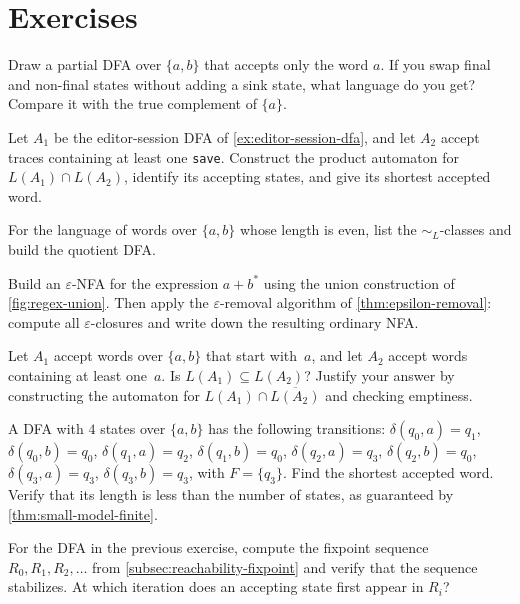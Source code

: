 \section*{Exercises}

\begin{chapex}
Draw a partial DFA over $\{a,b\}$ that accepts only the word $a$.  If you
swap final and non-final states without adding a sink state, what
language do you get?  Compare it with the true complement of $\{a\}$.
\end{chapex}

\begin{chapex}
Let \(A_1\) be the editor-session DFA of
\cref{ex:editor-session-dfa}, and let \(A_2\) accept traces containing
at least one \texttt{save}.  Construct the product automaton for
\(L(A_1)\cap L(A_2)\), identify its accepting states, and give its
shortest accepted word.
\end{chapex}

\begin{chapex}
For the language of words over $\{a,b\}$ whose length is even, list the
$\sim_L$-classes and build the quotient DFA.
\end{chapex}

\begin{chapex}
Build an $\varepsilon$-NFA for the expression $a+b^*$ using the union
construction of \cref{fig:regex-union}.  Then apply the
$\varepsilon$-removal algorithm of \cref{thm:epsilon-removal}: compute
all $\varepsilon$-closures and write down the resulting ordinary NFA.
\end{chapex}

\begin{chapex}
Let $A_1$ accept words over $\{a,b\}$ that start with~$a$, and let
$A_2$ accept words containing at least one~$a$.  Is
$L(A_1)\subseteq L(A_2)$?  Justify your answer by constructing the
automaton for $L(A_1)\cap\overline{L(A_2)}$ and checking emptiness.
\end{chapex}

\begin{chapex}
A DFA with $4$ states over $\{a,b\}$ has the following transitions:
$\delta(q_0,a)=q_1$, $\delta(q_0,b)=q_0$, $\delta(q_1,a)=q_2$,
$\delta(q_1,b)=q_0$, $\delta(q_2,a)=q_3$, $\delta(q_2,b)=q_0$,
$\delta(q_3,a)=q_3$, $\delta(q_3,b)=q_3$, with $F=\{q_3\}$.  Find the
shortest accepted word.  Verify that its length is less than the number
of states, as guaranteed by \cref{thm:small-model-finite}.
\end{chapex}

\begin{chapex}
For the DFA in the previous exercise, compute the fixpoint sequence
$R_0,R_1,R_2,\ldots$ from \cref{subsec:reachability-fixpoint} and
verify that the sequence stabilizes.  At which iteration does an
accepting state first appear in $R_i$?
\end{chapex}
